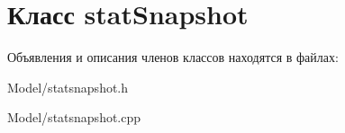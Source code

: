 \hypertarget{classstat_snapshot}{}\section{Класс stat\+Snapshot}
\label{classstat_snapshot}


Объявления и описания членов классов находятся в файлах\+:\begin{DoxyCompactItemize}
\item 
Model/statsnapshot.\+h\item 
Model/statsnapshot.\+cpp\end{DoxyCompactItemize}
